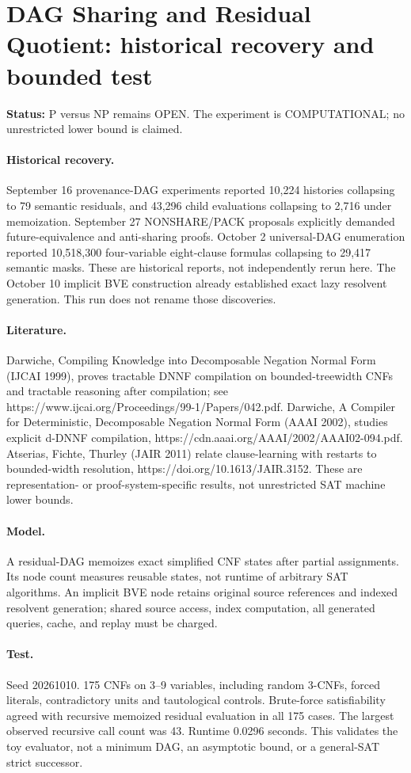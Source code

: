 \documentclass{article}
\begin{document}
\section*{DAG Sharing and Residual Quotient: historical recovery and bounded test}
\textbf{Status:} P versus NP remains OPEN. The experiment is COMPUTATIONAL; no unrestricted lower bound is claimed.
\paragraph{Historical recovery.} September 16 provenance-DAG experiments reported 10,224 histories collapsing to 79 semantic residuals, and 43,296 child evaluations collapsing to 2,716 under memoization. September 27 NONSHARE/PACK proposals explicitly demanded future-equivalence and anti-sharing proofs. October 2 universal-DAG enumeration reported 10,518,300 four-variable eight-clause formulas collapsing to 29,417 semantic masks. These are historical reports, not independently rerun here. The October 10 implicit BVE construction already established exact lazy resolvent generation. This run does not rename those discoveries.
\paragraph{Literature.} Darwiche, Compiling Knowledge into Decomposable Negation Normal Form (IJCAI 1999), proves tractable DNNF compilation on bounded-treewidth CNFs and tractable reasoning after compilation; see https://www.ijcai.org/Proceedings/99-1/Papers/042.pdf. Darwiche, A Compiler for Deterministic, Decomposable Negation Normal Form (AAAI 2002), studies explicit d-DNNF compilation, https://cdn.aaai.org/AAAI/2002/AAAI02-094.pdf. Atserias, Fichte, Thurley (JAIR 2011) relate clause-learning with restarts to bounded-width resolution, https://doi.org/10.1613/JAIR.3152. These are representation- or proof-system-specific results, not unrestricted SAT machine lower bounds.
\paragraph{Model.} A residual-DAG memoizes exact simplified CNF states after partial assignments. Its node count measures reusable states, not runtime of arbitrary SAT algorithms. An implicit BVE node retains original source references and indexed resolvent generation; shared source access, index computation, all generated queries, cache, and replay must be charged.
\paragraph{Test.} Seed 20261010. 175 CNFs on 3--9 variables, including random 3-CNFs, forced literals, contradictory units and tautological controls. Brute-force satisfiability agreed with recursive memoized residual evaluation in all 175 cases. The largest observed recursive call count was 43. Runtime 0.0296 seconds. This validates the toy evaluator, not a minimum DAG, an asymptotic bound, or a general-SAT strict successor.
\end{document}
